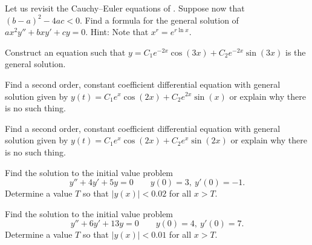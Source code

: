 \begin{exercise}
Let us revisit the Cauchy--Euler equations of
.  Suppose now
that ${(b-a)}^2-4ac < 0$.  Find a formula for the general solution
of $a x^2 y'' + b x y' + c y = 0$.  Hint: Note that $x^r = e^{r \ln x}$.
\end{exercise}

\begin{exercise}
Construct an equation such that $y = C_1 e^{-2x} \cos(3x) + C_2 e^{-2x}
\sin(3x)$ is the general
solution.
\end{exercise}

\begin{exercise}\ansMark%
Find a second order, constant coefficient differential equation with general solution given by $y(t) = C_1e^{x} \cos(2x) + C_2e^{2x}\sin(x)$ or explain why there is no such thing.
\end{exercise}
%

\begin{exercise}
Find a second order, constant coefficient differential equation with general solution given by $y(t) = C_1e^{x} \cos(2x) + C_2e^{x}\sin(2x)$ or explain why there is no such thing.
\end{exercise}

\begin{exercise}
Find the solution to the initial value problem 
\[ y'' + 4y' + 5y = 0 \qquad y(0) = 3,\ y'(0) = -1.\]
Determine a value $T$ so that $|y(x)| < 0.02$ for all $x > T$. 
\end{exercise}

\begin{exercise}
Find the solution to the initial value problem 
\[ y'' + 6y' + 13y = 0 \qquad y(0) = 4,\ y'(0) = 7.\]
Determine a value $T$ so that $|y(x)| < 0.01$ for all $x > T$. 
\end{exercise}

\setcounter{exercise}{100}






